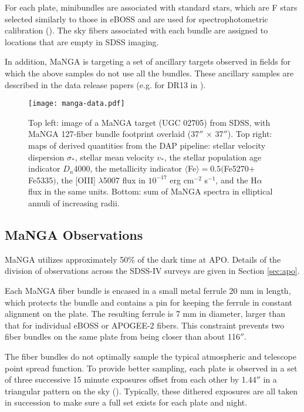 For each plate, minibundles are associated with standard stars, which
are F stars selected similarly to those in eBOSS and are used for
spectrophotometric calibration (\citealt{yan16a}). The sky fibers
associated with each bundle are assigned to locations that are empty
in SDSS imaging.

In addition, MaNGA is targeting a set of ancillary targets observed in
fields for which the above samples do not use all the bundles. These
ancillary samples are described in the data release papers
(e.g. for DR13 in \citealt{albareti16a}).

\begin{figure*}[t!]
\centering
\texttt{[image: manga-data.pdf]}
\caption{Top left: image of a MaNGA target (UGC 02705) from SDSS, with
  MaNGA 127-fiber bundle footprint overlaid (37$''$ $\times$ 37$''$).
  Top right: maps of derived quantities from the DAP pipeline: stellar
  velocity dispersion $\sigma_\ast$, stellar mean velocity $v_\ast$,
  the stellar population age indicator $D_n$4000, the metallicity
  indicator $\langle$Fe$\rangle = 0.5($Fe5270$+$Fe5335$)$, the [OIII]
  $\lambda$5007 flux in $10^{-17}$ erg cm$^{-2}$ s$^{-1}$, and the
  H$\alpha$ flux in the same units.  Bottom: sum of MaNGA spectra in
  elliptical annuli of increasing radii.
\label{fig:manga-data}}
\end{figure*}

\subsection{MaNGA Observations}
\label{sec:manga:observations}

MaNGA utilizes approximately 50\% of the dark time at APO. Details of
the division of observations across the SDSS-IV surveys are given in
Section \ref{sec:apo}.

Each MaNGA fiber bundle is encased in a small metal ferrule 20 mm in
length, which protects the bundle and contains a pin for keeping the
ferrule in constant alignment on the plate. The resulting ferrule is 7
mm in diameter, larger than that for individual eBOSS or APOGEE-2
fibers. This constraint prevents two fiber bundles on the same plate
from being closer than about 116$''$.

The fiber bundles do not optimally sample the typical atmospheric and
telescope point spread function. To provide better sampling, each
plate is observed in a set of three successive 15 minute exposures
offset from each other by 1.44$''$ in a triangular pattern on the sky
(\citealt{law15a}). Typically, these dithered exposures are all taken 
in succession to make sure a full set exists for each plate and night.

